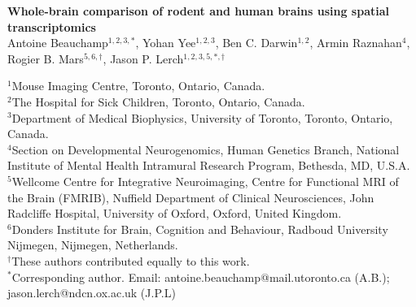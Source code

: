 
\LARGE{\textbf{Whole-brain comparison of rodent and human brains using spatial transcriptomics}}\\

\large
Antoine Beauchamp$^{1,2,3,*}$, Yohan Yee$^{1,2,3}$, Ben C. Darwin$^{1,2}$, Armin Raznahan$^{4}$, Rogier B. Mars$^{5,6,\dagger}$, Jason P. Lerch$^{1,2,3,5,*,\dagger}$\\

\onehalfspacing

\small
$^1$Mouse Imaging Centre, Toronto, Ontario, Canada.\\
$^2$The Hospital for Sick Children, Toronto, Ontario, Canada.\\
$^3$Department of Medical Biophysics, University of Toronto, Toronto, Ontario, Canada.\\
$^4$Section on Developmental Neurogenomics, Human Genetics Branch, National Institute of Mental Health Intramural Research Program, Bethesda, MD, U.S.A.\\
$^5$Wellcome Centre for Integrative Neuroimaging, Centre for Functional MRI of the Brain (FMRIB), Nuffield Department of Clinical Neurosciences, John Radcliffe Hospital, University of Oxford, Oxford, United Kingdom.\\
$^6$Donders Institute for Brain, Cognition and Behaviour, Radboud University Nijmegen, Nijmegen, Netherlands.\\
$^{\dagger}$These authors contributed equally to this work.\\
$^{*}$Corresponding author. Email: antoine.beauchamp@mail.utoronto.ca (A.B.); jason.lerch@ndcn.ox.ac.uk (J.P.L)

\normalsize
{}